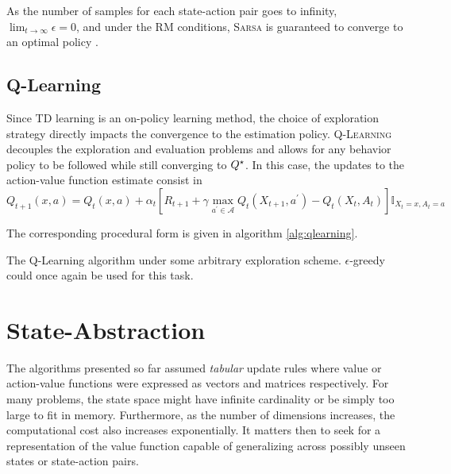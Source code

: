 As the number of samples for each state-action pair goes to infinity, $\lim_{t \to
\infty} \epsilon = 0$, and under the RM conditions, \textsc{Sarsa} is guaranteed to converge to
an optimal policy \parencite{SuttonBarto1998}. 

\subsection{Q-Learning}

Since TD learning is an on-policy learning method, the choice of exploration strategy
directly impacts the convergence to the estimation policy. \textsc{Q-Learning}
\parencite{Watkins1989} decouples the exploration and evaluation problems and allows for
any behavior policy to be followed while still converging to $Q^\star$. In this case,
the updates to the action-value function estimate consist in
\begin{equation}
Q_{t+1} (x,a) = Q_t(x,a) + \alpha_t \left[ R_{t+1} + \gamma \max_{a^\prime \in
\mathcal{A}} Q_t(X_{t+1}, a^\prime) - Q_t(X_t, A_t) \right] \mathbb{I}_{X_t = x, A_t = a} 
\label{eq:qlearning-update}
\end{equation}

The corresponding procedural form is given in algorithm \ref{alg:qlearning}.

\begin{algorithm}
\DontPrintSemicolon
{}
\caption{The Q-Learning algorithm under some arbitrary exploration scheme.
$\epsilon$-greedy could once again be used for this task.}
\label{alg:qlearning}
\end{algorithm}

\section{State-Abstraction}
The algorithms presented so far assumed \textit{tabular} update rules where value or
action-value functions were expressed as vectors and matrices respectively. For many
problems, the state space might have infinite cardinality or be simply too large to fit in
memory. Furthermore, as the number of dimensions increases, the computational cost
also increases exponentially. It matters then to seek for a representation of the
value function capable of generalizing across possibly unseen states or state-action
pairs.

